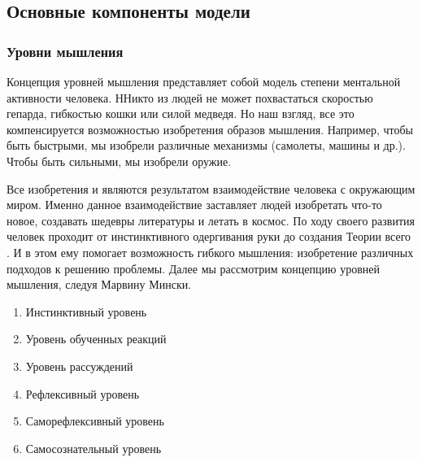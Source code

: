 \clearpage
\subsection{Основные компоненты модели}
\subsubsection{Уровни мышления}
Концепция уровней мышления представляет собой модель степени ментальной активности человека. ННикто из людей не может похвастаться скоростью гепарда, гибкостью кошки или силой медведя. Но наш взгляд, все это компенсируется возможностью изобретения образов мышления. Например, чтобы быть быстрыми, мы изобрели различные механизмы (самолеты, машины и др.). Чтобы быть сильными, мы изобрели оружие. \par
 Все изобретения и являются результатом взаимодействие человека с окружающим миром. Именно данное взаимодействие заставляет людей изобретать что-то новое, создавать шедевры литературы и летать в космос. По ходу своего развития человек проходит от инстинктивного одергивания руки до создания Теории всего \cite{Hawking}. И в этом ему помогает возможность гибкого мышления: изобретение различных подходов к решению проблемы. Далее мы рассмотрим концепцию уровней мышления, следуя Марвину Мински. \par
\begin{enumerate}
	\item Инстинктивный уровень
	\item Уровень обученных реакций
	\item Уровень рассуждений
	\item Рефлексивный уровень
	\item Саморефлексивный уровень
	\item Самосознательный уровень
\end{enumerate} \par

